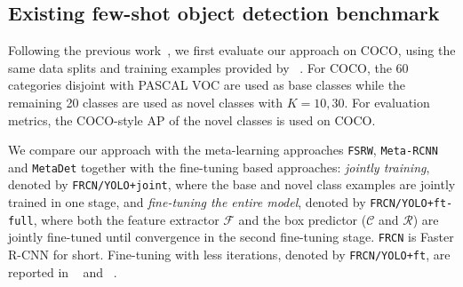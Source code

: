 \subsection{Existing few-shot object detection benchmark}
\label{sec:exist_benchmark}
Following the previous work~\cite{kang2019few,yan2019meta,wang2019meta}, we 
first evaluate our approach on COCO, using the same data splits and training examples provided by ~\citet{kang2019few}.
For COCO, the 60 categories disjoint with PASCAL VOC are used as base classes while the remaining 20 classes are used as novel classes with $K=10, 30$.  For evaluation metrics, the COCO-style AP of the novel classes is used on COCO. 

 We compare our approach with the meta-learning approaches \texttt{FSRW}, \texttt{Meta-RCNN} and \texttt{MetaDet} together with the fine-tuning
based approaches:  \emph{jointly training}, denoted by \texttt{FRCN/YOLO+joint}, where the base and novel class examples are jointly trained in one stage,  and \emph{fine-tuning the entire model}, denoted by \texttt{FRCN/YOLO+ft-full}, where both the feature extractor $\mathcal{F}$ and the box predictor ($\mathcal{C}$ and $\mathcal{R}$) are jointly fine-tuned until convergence in the second fine-tuning stage. \texttt{FRCN} is Faster R-CNN for short. Fine-tuning with less iterations, denoted by \texttt{FRCN/YOLO+ft}, are reported in ~\citet{kang2019few} and ~\citet{yan2019meta}.

